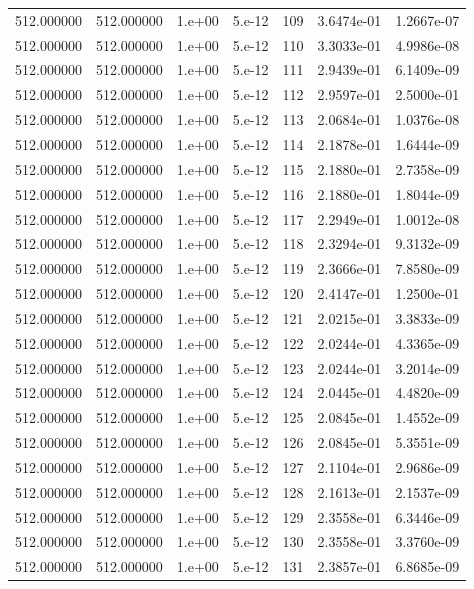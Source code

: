 \begin{table}[htbp]
\begin{tabular}{rrrrrrr}
512.000000 & 512.000000 & 1.e+00 & 5.e-12 & 109 & 3.6474e-01 & 1.2667e-07 \\
512.000000 & 512.000000 & 1.e+00 & 5.e-12 & 110 & 3.3033e-01 & 4.9986e-08 \\
512.000000 & 512.000000 & 1.e+00 & 5.e-12 & 111 & 2.9439e-01 & 6.1409e-09 \\
512.000000 & 512.000000 & 1.e+00 & 5.e-12 & 112 & 2.9597e-01 & 2.5000e-01 \\
512.000000 & 512.000000 & 1.e+00 & 5.e-12 & 113 & 2.0684e-01 & 1.0376e-08 \\
512.000000 & 512.000000 & 1.e+00 & 5.e-12 & 114 & 2.1878e-01 & 1.6444e-09 \\
512.000000 & 512.000000 & 1.e+00 & 5.e-12 & 115 & 2.1880e-01 & 2.7358e-09 \\
512.000000 & 512.000000 & 1.e+00 & 5.e-12 & 116 & 2.1880e-01 & 1.8044e-09 \\
512.000000 & 512.000000 & 1.e+00 & 5.e-12 & 117 & 2.2949e-01 & 1.0012e-08 \\
512.000000 & 512.000000 & 1.e+00 & 5.e-12 & 118 & 2.3294e-01 & 9.3132e-09 \\
512.000000 & 512.000000 & 1.e+00 & 5.e-12 & 119 & 2.3666e-01 & 7.8580e-09 \\
512.000000 & 512.000000 & 1.e+00 & 5.e-12 & 120 & 2.4147e-01 & 1.2500e-01 \\
512.000000 & 512.000000 & 1.e+00 & 5.e-12 & 121 & 2.0215e-01 & 3.3833e-09 \\
512.000000 & 512.000000 & 1.e+00 & 5.e-12 & 122 & 2.0244e-01 & 4.3365e-09 \\
512.000000 & 512.000000 & 1.e+00 & 5.e-12 & 123 & 2.0244e-01 & 3.2014e-09 \\
512.000000 & 512.000000 & 1.e+00 & 5.e-12 & 124 & 2.0445e-01 & 4.4820e-09 \\
512.000000 & 512.000000 & 1.e+00 & 5.e-12 & 125 & 2.0845e-01 & 1.4552e-09 \\
512.000000 & 512.000000 & 1.e+00 & 5.e-12 & 126 & 2.0845e-01 & 5.3551e-09 \\
512.000000 & 512.000000 & 1.e+00 & 5.e-12 & 127 & 2.1104e-01 & 2.9686e-09 \\
512.000000 & 512.000000 & 1.e+00 & 5.e-12 & 128 & 2.1613e-01 & 2.1537e-09 \\
512.000000 & 512.000000 & 1.e+00 & 5.e-12 & 129 & 2.3558e-01 & 6.3446e-09 \\
512.000000 & 512.000000 & 1.e+00 & 5.e-12 & 130 & 2.3558e-01 & 3.3760e-09 \\
512.000000 & 512.000000 & 1.e+00 & 5.e-12 & 131 & 2.3857e-01 & 6.8685e-09 \\

\end{tabular}
\end{table}
